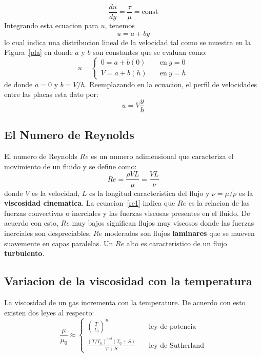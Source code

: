 \documentclass[10pt, oneside]{article}
\begin{document}
$$
\frac{du}{dy}=\frac{\tau}{\mu}=\text{const}
$$
Integrando esta ecuacion para $u$, tenemos
$$
u=a+by
$$
lo cual indica una distribucion lineal de la velocidad tal como se muestra en la Figura~\ref{pla} en donde $a$ y $b$ son constantes que se evaluan como:
$$
u= 
\begin{cases}
0 = a+b(0) & \quad \text{en}\ y=0 \\
V = a+b(h) & \quad \text{en}\ y=h 
\end{cases}
$$
de donde $a=0$ y $b=V/h$. Reemplazando en la ecuacion, el perfil de velocidades entre las placas esta dato por:
\begin{equation}
u=V\frac{y}{h}
\label{upl}
\end{equation}


\subsection{El Numero de Reynolds}
El numero de Reynolds $Re$ es un numero adimensional que caracteriza el movimiento de un fluido y se define como:
\begin{equation}
Re=\frac{\rho VL}{\mu}=\frac{VL}{\nu}
\label{re1}
\end{equation}
donde $V$ es la velocidad, $L$ es la longitud caracteristica del flujo y $\nu=\mu/\rho$  es la \textbf{viscosidad cinematica}. La ecuacion~\ref{re1} indica que $Re$ es la relacion de las fuerzas convectivas o inerciales y las fuerzas viscosas presentes en el fluido. De acuerdo con esto, $Re$ muy bajos significan flujos muy viscosos donde las fuerzas inerciales son despreciables. $Re$ moderados son flujos \textbf{laminares} que se mueven suavemente en capas paralelas. Un $Re$ alto es caracteristico de un flujo \textbf{turbulento}.  

\subsection{Variacion de la viscosidad con la temperatura}
La viscosidad de un gas incrementa con la temperature. De acuerdo con esto existen dos leyes al respecto:
\begin{equation}
\frac{\mu}{\mu_0} \approx 
\begin{cases}
\left( \frac{T}{T_0} \right)^n & \quad \text{ley de potencia} \\
\frac{(T/T_0 )^{3/2}(T_0 + S)}{T+S} & \quad \text{ley de Sutherland} 
\end{cases}
\label{vist}
\end{equation}
\end{document}
